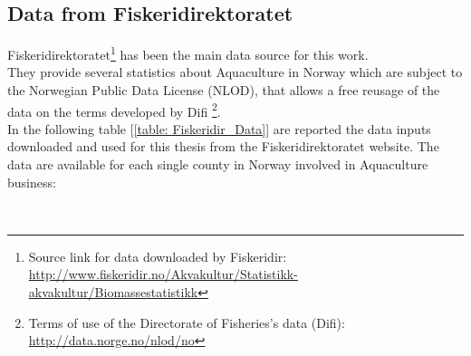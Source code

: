 \newpage
 
\subsection{Data from Fiskeridirektoratet} 
Fiskeridirektoratet\footnote{Source link for data downloaded by Fiskeridir: \\ \url{http://www.fiskeridir.no/Akvakultur/Statistikk-akvakultur/Biomassestatistikk}} has been the main data source for this work.\\ They provide several statistics about Aquaculture in Norway which are subject to the Norwegian Public Data License (NLOD), that allows a free reusage of the data on the terms developed by Difi \footnote{Terms of use of the Directorate of Fisheries's data (Difi): \\ \url{http://data.norge.no/nlod/no}}.\\
In the following table [\ref{table: Fiskeridir_Data}] are reported the data inputs downloaded and used for this thesis from the Fiskeridirektoratet website. The data are available for each single county in Norway involved in Aquaculture business:

\begin{table}[ht]
\\
     \caption{Data provided from Fiskeridirektoratet.}
    \label{table: Fiskeridir_Data} 
\end{table}  
    
